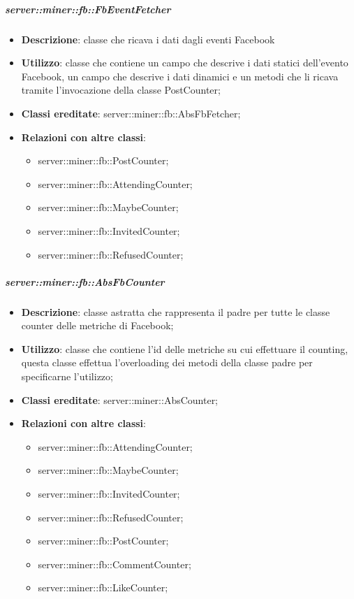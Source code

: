 		\subparagraph{server::miner::fb::FbEventFetcher} %
		\label{subp:server_miner_fb_FbEventFetcher}
			\begin{itemize}
				\item \textbf{Descrizione}: classe che ricava i dati dagli eventi Facebook
				\item \textbf{Utilizzo}: classe che contiene un campo che descrive i dati statici dell'evento Facebook, un campo che descrive i dati dinamici e un metodi che li ricava tramite l'invocazione della classe PostCounter;
				\item \textbf{Classi ereditate}: server::miner::fb::AbsFbFetcher;
				\item \textbf{Relazioni con altre classi}:
					\begin{itemize}
						\item server::miner::fb::PostCounter;
						\item server::miner::fb::AttendingCounter;
						\item server::miner::fb::MaybeCounter;
						\item server::miner::fb::InvitedCounter;
						\item server::miner::fb::RefusedCounter;
					\end{itemize}
			\end{itemize}
	
		\subparagraph{server::miner::fb::AbsFbCounter} %
		\label{subp:server_miner_fb_AbsFbCounter}
			\begin{itemize}
				\item \textbf{Descrizione}: classe astratta che rappresenta il padre per tutte le classe counter delle metriche di Facebook;
				\item \textbf{Utilizzo}: classe che contiene l'id delle metriche su cui effettuare il counting, questa classe effettua l'overloading dei metodi della classe padre per specificarne l'utilizzo;
				\item \textbf{Classi ereditate}: server::miner::AbsCounter;
				\item \textbf{Relazioni con altre classi}:
					\begin{itemize}
						\item server::miner::fb::AttendingCounter;
						\item server::miner::fb::MaybeCounter;
						\item server::miner::fb::InvitedCounter;
						\item server::miner::fb::RefusedCounter;
						\item server::miner::fb::PostCounter;
						\item server::miner::fb::CommentCounter;
						\item server::miner::fb::LikeCounter;
					\end{itemize}
			\end{itemize}
	
